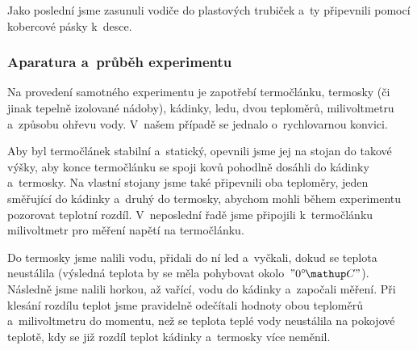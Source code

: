 Jako poslední jsme zasunuli vodiče do plastových trubiček a~ty připevnili
pomocí kobercové pásky k~desce.

\subsubsection{Aparatura a~průběh experimentu}
Na provedení samotného experimentu je zapotřebí termočlánku, termosky (či jinak
tepelně izolované nádoby), kádinky, ledu, dvou teploměrů, milivoltmetru
a~způsobu ohřevu vody. V~našem případě se jednalo o~rychlovarnou konvici.

Aby byl termočlánek stabilní a~statický, opevnili jsme jej na stojan do takové
výšky, aby konce termočlánku se spoji kovů pohodlně dosáhli do kádinky
a~termosky. Na vlastní stojany jsme také připevnili oba teploměry, jeden
směřující do kádinky a~druhý do termosky, abychom mohli během experimentu
pozorovat teplotní rozdíl. V~neposlední řadě jsme připojili k~termočlánku
milivoltmetr pro měření napětí na termočlánku. 

Do termosky jsme nalili vodu, přidali do ní led a~vyčkali, dokud se teplota
neustálila (výsledná teplota by se měla pohybovat okolo~$"0\C"$). Následně jsme
nalili horkou, až vařící, vodu do kádinky a~započali měření. Při klesání
rozdílu teplot jsme pravidelně odečítali hodnoty obou teploměrů a~milivoltmetru
do momentu, než se teplota teplé vody neustálila na pokojové teplotě, kdy se
již rozdíl teplot kádinky a~termosky více neměnil.
